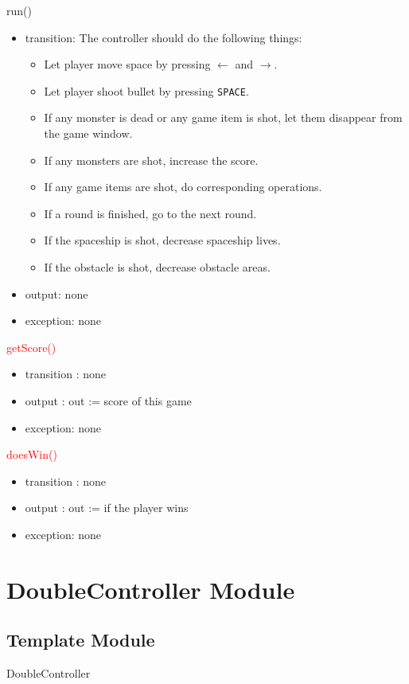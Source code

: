 \documentclass[12pt]{article}
\begin{document}
\noindent run()
\begin{itemize}
\item transition: The controller should do the following things:
\begin{itemize}
\item Let player move space by pressing $\leftarrow$ and $\rightarrow$.
\item Let player shoot bullet by pressing \verb|SPACE|.
\item If any monster is dead or any game item is shot, let them disappear from the game window. 
\item If any monsters are shot, increase the score.
\item If any game items are shot, do corresponding operations. 
\item If a round is finished, go to the next round.
\item If the spaceship is shot, decrease spaceship lives.
\item If the obstacle is shot, decrease obstacle areas.
\end{itemize}
\item output: none
\item exception: none
\end{itemize}

\noindent \textcolor{red}{getScore()}
\begin{itemize}
\item transition : none
\item output : out := score of this game
\item exception: none
\end{itemize}

\noindent \textcolor{red}{doesWin()}
\begin{itemize}
\item transition : none
\item output : out := if the player wins
\item exception: none
\end{itemize}

\newpage

\section{DoubleController Module}

\subsection*{Template Module}
DoubleController
\end{document}
